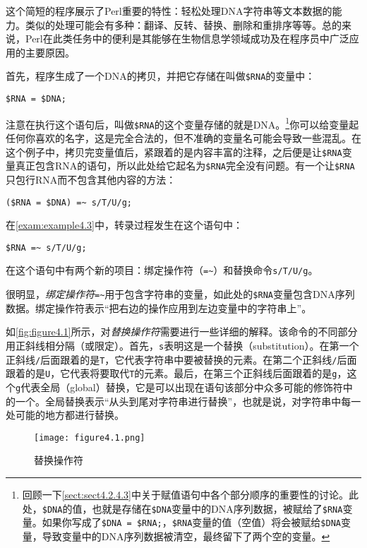 这个简短的程序展示了Perl重要的特性：轻松处理DNA字符串等文本数据的能力。类似的处理可能会有多种：翻译、反转、替换、删除和重排序等等。总的来说，Perl在此类任务中的便利是其能够在生物信息学领域成功及在程序员中广泛应用的主要原因。

首先，程序生成了一个DNA的拷贝，并把它存储在叫做\verb|$RNA|的变量中：

\begin{lstlisting}
$RNA = $DNA;
\end{lstlisting}

注意在执行这个语句后，叫做\verb|$RNA|的这个变量存储的就是DNA。\footnote{回顾一下\autoref{sect:sect4.2.4.3}中关于赋值语句中各个部分顺序的重要性的讨论。此处，\verb|$DNA|的值，也就是存储在\verb|$DNA|变量中的DNA序列数据，被赋给了\verb|$RNA|变量。如果你写成了\verb|$DNA = $RNA;|，\verb|$RNA|变量的值（空值）将会被赋给\verb|$DNA|变量，导致变量中的DNA序列数据被清空，最终留下了两个空的变量。}你可以给变量起任何你喜欢的名字，这是完全合法的，但不准确的变量名可能会导致一些混乱。在这个例子中，拷贝完变量值后，紧跟着的是内容丰富的注释，之后便是让\verb|$RNA|变量真正包含RNA的语句，所以此处给它起名为\verb|$RNA|完全没有问题。有一个让\verb|$RNA|只包行RNA而不包含其他内容的方法：

\begin{lstlisting}
($RNA = $DNA) =~ s/T/U/g;
\end{lstlisting}

在\autoref{exam:example4.3}中，转录过程发生在这个语句中：

\begin{lstlisting}
$RNA =~ s/T/U/g;
\end{lstlisting}

在这个语句中有两个新的项目：绑定操作符（\verb|=~|）和替换命令\verb|s/T/U/g|。

很明显，\textit{绑定操作符}\verb|=~|用于包含字符串的变量，如此处的\verb|$RNA|变量包含DNA序列数据。绑定操作符表示“把右边的操作应用到左边变量中的字符串上”。

如\autoref{fig:figure4.1}所示，对\textit{替换操作符}需要进行一些详细的解释。该命令的不同部分用正斜线相分隔（或限定）。首先，\verb|s|表明这是一个替换（substitution）。在第一个正斜线\verb|/|后面跟着的是\verb|T|，它代表字符串中要被替换的元素。在第二个正斜线\verb|/|后面跟着的是\verb|U|，它代表将要取代\verb|T|的元素。最后，在第三个正斜线后面跟着的是\verb|g|，这个\verb|g|代表全局（global）替换，它是可以出现在语句该部分中众多可能的修饰符中的一个。全局替换表示“从头到尾对字符串进行替换”，也就是说，对字符串中每一处可能的地方都进行替换。

\begin{figure}
  \centering
  \texttt{[image: figure4.1.png]}
  \caption{替换操作符}
  \label{fig:figure4.1}
\end{figure}

